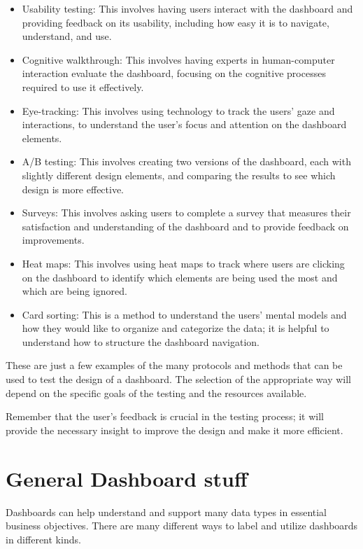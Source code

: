 \documentclass[print]{nuthesis}
\providecommand{\tightlist}{%
  \setlength{\itemsep}{0pt}\setlength{\parskip}{0pt}}
\begin{document}
\begin{itemize}
\tightlist
\item
  Usability testing: This involves having users interact with the dashboard and providing feedback on its usability, including how easy it is to navigate, understand, and use.
\item
  Cognitive walkthrough: This involves having experts in human-computer interaction evaluate the dashboard, focusing on the cognitive processes required to use it effectively.
\item
  Eye-tracking: This involves using technology to track the users' gaze and interactions, to understand the user's focus and attention on the dashboard elements.
\item
  A/B testing: This involves creating two versions of the dashboard, each with slightly different design elements, and comparing the results to see which design is more effective.
\item
  Surveys: This involves asking users to complete a survey that measures their satisfaction and understanding of the dashboard and to provide feedback on improvements.
\item
  Heat maps: This involves using heat maps to track where users are clicking on the dashboard to identify which elements are being used the most and which are being ignored.
\item
  Card sorting: This is a method to understand the users' mental models and how they would like to organize and categorize the data; it is helpful to understand how to structure the dashboard navigation.
\end{itemize}

These are just a few examples of the many protocols and methods that can be used to test the design of a dashboard. The selection of the appropriate way will depend on the specific goals of the testing and the resources available.

Remember that the user's feedback is crucial in the testing process; it will provide the necessary insight to improve the design and make it more efficient.

\hypertarget{general-dashboard-stuff}{%
\section{General Dashboard stuff}\label{general-dashboard-stuff}}

Dashboards can help understand and support many data types in essential business objectives. There are many different ways to label and utilize dashboards in different kinds.
\end{document}

